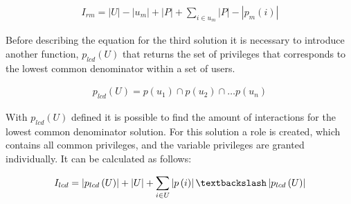 \begin{align}
I_{rm} = |U| - |u_{m}| + |P| + \sum_{i \in u_{m}} |P|-|p_{m}(i)|
\end{align}

Before describing the equation for the third solution it is necessary to introduce another function, $p_{lcd}(U)$ that returns the set of privileges that corresponds to the lowest common denominator within a set of users.

\begin{align}
p_{lcd}(U) = p(u_1) \cap p(u_2) \cap \dots p(u_n)
\end{align}

With $p_{lcd}(U)$ defined it is possible to find the amount of interactions for the lowest common denominator solution. For this solution a role is created, which contains all common privileges, and the variable privileges are granted individually. It can be calculated as follows:

\begin{align}
I_{lcd} = \left|p_{lcd}\left(U\right)\right| + \left|U\right| + \sum_{i \in U} \left|p\left(i\right)\right|\textbackslash\left|p_{lcd}\left(U\right)\right|
\end{align}